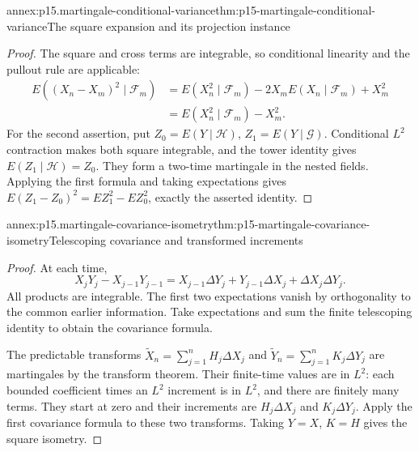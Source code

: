 \begin{annexitem}{annex:p15.martingale-conditional-variance}{thm:p15-martingale-conditional-variance}{The square expansion and its projection instance}
\begin{proof}
The square and cross terms are integrable, so conditional linearity
and the pullout rule are applicable:
\[
 \begin{aligned}
 E((X_n-X_m)^2\mid\mathcal F_m)
   &=E(X_n^2\mid\mathcal F_m)
       -2X_mE(X_n\mid\mathcal F_m)+X_m^2\\
   &=E(X_n^2\mid\mathcal F_m)-X_m^2.
 \end{aligned}
\]
For the second assertion, put \(Z_0=E(Y\mid\mathcal H)\),
\(Z_1=E(Y\mid\mathcal G)\).
Conditional \(L^2\) contraction makes both square integrable, and
the tower identity gives \(E(Z_1\mid\mathcal H)=Z_0\).
They form a two-time martingale in the nested fields.
Applying the first formula and taking expectations gives
\(E(Z_1-Z_0)^2=EZ_1^2-EZ_0^2\), exactly the asserted identity.
\end{proof}
\end{annexitem}

\begin{annexitem}{annex:p15.martingale-covariance-isometry}{thm:p15-martingale-covariance-isometry}{Telescoping covariance and transformed increments}
\begin{proof}
At each time,
\[
 X_jY_j-X_{j-1}Y_{j-1}
      =X_{j-1}\Delta Y_j+Y_{j-1}\Delta X_j+\Delta X_j\Delta Y_j.
\]
All products are integrable. The first two expectations vanish
by orthogonality to the common earlier information.
Take expectations and sum the finite telescoping identity to
obtain the covariance formula.

The predictable transforms
\(\widetilde X_n=\sum_{j=1}^nH_j\Delta X_j\) and
\(\widetilde Y_n=\sum_{j=1}^nK_j\Delta Y_j\)
are martingales by the transform theorem.
Their finite-time values are in \(L^2\): each bounded coefficient
times an \(L^2\) increment is in \(L^2\), and there are finitely
many terms. They start at zero and their increments are
\(H_j\Delta X_j\) and \(K_j\Delta Y_j\).
Apply the first covariance formula to these two transforms.
Taking \(Y=X\), \(K=H\) gives the square isometry.
\end{proof}
\end{annexitem}

